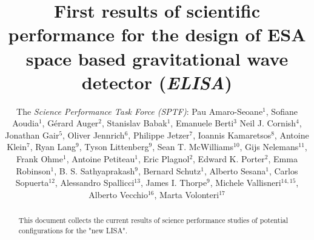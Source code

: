 \documentclass{iopart}
\begin{document}
\title
{First results of scientific performance for the design of ESA space based gravitational wave detector ({\it ELISA}) }

\author{The \emph{Science Performance Task Force (SPTF)}:
Pau Amaro-Seoane$^1$,
Sofiane Aoudia$^1$,
G\'erard Auger$^2$,
Stanislav Babak$^1$,
Emanuele Berti$^3$
Neil J. Cornish$^4$,
Jonathan Gair$^5$,
Oliver Jennrich$^6$,
Philippe Jetzer$^7$,
Ioannis Kamaretsos$^8$,
Antoine Klein$^7$,
Ryan Lang$^9$,
Tyson Littenberg$^9$,
Sean T. McWilliams$^{10}$,
Gijs Nelemans$^{11}$,
Frank Ohme$^1$,
Antoine Petiteau$^1$,
Eric Plagnol$^2$,
Edward K. Porter$^2$,
Emma Robinson$^1$,
B. S. Sathyaprakash$^9$,
Bernard Schutz$^1$,
Alberto Sesana$^1$,
Carlos Sopuerta$^{12}$,
Alessandro Spallicci$^{13}$,
James I. Thorpe$^9$,
Michele Vallisneri$^{14,15}$,
Alberto Vecchio$^{16}$,
Marta Volonteri$^{17}$
}

\address{$^1$ Max-Planck-Institut f\"ur Gravitationsphysik (Albert-Einstein-Institut), Am M\"uhlenberg 1, D-14476 Golm bei Potsdam, Germany}
\address{$^2$ APC, UMR 7164, Univ.\ Paris 7 Denis Diderot, 10, rue Alice Domon et Leonie Duquet, 75025 Paris Cedex 13, France}
\address{$^3$ University of Mississippi, USA}
\address{$^4$ Dept.\ of Physics, Montana State Univ., Bozeman, MT 59717, USA}
\address{$^5$ Inst.\ of Astronomy, Univ.\ of Cambridge, Madingley Rd., Cambridge, CB30HA, UK}
\address{$^6$ European Space Agency}
\address{$^7$ Institute of Theoretical Physics, University of Zurich}
\address{$^8$ School of Physics and Astronomy, Cardiff Univ., 5, The Parade, Cardiff, CF243YB, UK}
\address{$^9$ Gravitational Astrophysics Lab., NASA Goddard Space Flight Center, 8800 Greenbelt Rd., Greenbelt, MD 20771, USA}
\address{$^{10}$ Department of Physics, Princeton University, Princeton, NJ 08544, USA}
\address{$^{11}$ Department of Astrophysics, Radboud University Nijmegen, The Netherlands}
\address{$^{12}$ Institute of Space Sciences (ICE-CSIC), Barcelona, Spain}
\address{$^{13}$ University of Orleans, France}
\address{$^{14}$ Jet Propulsion Laboratory, California Inst.\ of Technology, Pasadena, CA 91109, USA}
\address{$^{15}$ Theoretical Astrophysics, California Inst.\ of Technology, Pasadena, CA 91125}
\address{$^{16}$ School of Physics and Astronomy, Univ.\ of Birmingham, Edgbaston, Birmingham B152TT, UK}
\address{$^{17}$ University of Michigan}



\begin{abstract}

This document collects the current results of science performance studies of potential configurations for the "new LISA".    

\end{abstract}
\end{document}
